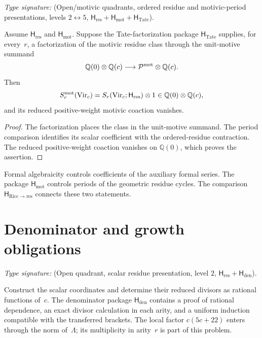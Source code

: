 \begin{theorem}
\ClaimStatusConditional
\label{thm:virasoro-motivic-purity}
\emph{Type signature:}
\textup{(Open/motivic quadrants, ordered residue and motivic-period
presentations, levels \(2\leftrightarrow5\),
\(\mathsf H_{\mathrm{res}}+\mathsf H_{\mathrm{mot}}
+\mathsf H_{\mathrm{Tate}}\)).}

Assume \(\mathsf H_{\mathrm{res}}\) and
\(\mathsf H_{\mathrm{mot}}\).  Suppose the Tate-factorization package
\(\mathsf H_{\mathrm{Tate}}\) supplies, for every~\(r\), a
factorization of the motivic residue class through the unit-motive
summand
\[
 \mathbb Q(0)\otimes\mathbb Q(c)
 \longrightarrow \mathcal P^{\mathrm{mot}}\otimes\mathbb Q(c).
\]
Then
\[
 S_r^{\mathrm{mot}}(\mathrm{Vir}_c)
 =S_r(\mathrm{Vir}_c;\mathsf H_{\mathrm{res}})\otimes1
 \in\mathbb Q(0)\otimes\mathbb Q(c),
\]
and its reduced positive-weight motivic coaction vanishes.
\end{theorem}

\begin{proof}
The factorization places the class in the unit-motive summand.  The
period comparison identifies its scalar coefficient with the
ordered-residue contraction.  The reduced positive-weight coaction
vanishes on \(\mathbb Q(0)\), which proves the assertion.
\end{proof}

\begin{remark}
\label{rem:vmp-convergence-of-sqrt}
Formal algebraicity controls coefficients of the auxiliary formal
series.  The package \(\mathsf H_{\mathrm{mot}}\) controls periods of
the geometric residue cycles.  The comparison
\(\mathsf H_{\mathrm{Ricc}\to\mathrm{res}}\) connects these two
statements.
\end{remark}

\section{Denominator and growth obligations}
\label{sec:vmp-denominator}

\begin{problem}
\ClaimStatusOpen
\label{prop:denominator-structure}
\emph{Type signature:}
\textup{(Open quadrant, scalar residue presentation, level \(2\),
\(\mathsf H_{\mathrm{res}}+\mathsf H_{\mathrm{den}}\)).}

Construct the scalar coordinates and determine their reduced divisors
as rational functions of~\(c\).  The denominator package
\(\mathsf H_{\mathrm{den}}\) contains a proof of rational dependence,
an exact divisor calculation in each arity, and a uniform induction
compatible with the transferred brackets.  The local factor
\(c(5c+22)\) enters through the norm of~\(\Lambda\); its
multiplicity in arity~\(r\) is part of this problem.
\end{problem}

